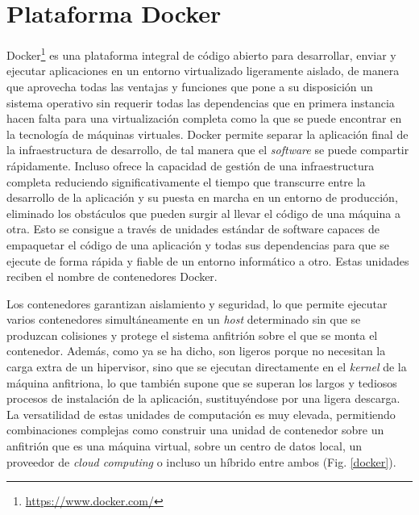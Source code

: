 \section{Plataforma Docker}

Docker\footnote{\url{https://www.docker.com/}} es una plataforma integral de código abierto para desarrollar, enviar y ejecutar aplicaciones en un entorno virtualizado ligeramente aislado, de manera que aprovecha todas las ventajas y funciones que pone a su disposición un sistema operativo sin requerir todas las dependencias que en primera instancia hacen falta para una virtualización completa como la que se puede encontrar en la tecnología de máquinas virtuales. Docker permite separar la aplicación final de la infraestructura de desarrollo, de tal manera que el \textit{software} se puede compartir rápidamente. Incluso ofrece la capacidad de gestión de una infraestructura completa reduciendo significativamente el tiempo que transcurre entre la desarrollo de la aplicación y su puesta en marcha en un entorno de producción, eliminado los obstáculos que pueden surgir al llevar el código de una máquina a otra. Esto se consigue a través de unidades estándar de software capaces de empaquetar el código de una aplicación y todas sus dependencias para que se ejecute de forma rápida y fiable de un entorno informático a otro. Estas unidades reciben el nombre de contenedores Docker.

Los contenedores garantizan aislamiento y seguridad, lo que permite ejecutar varios contenedores simultáneamente en un \textit{host} determinado sin que se produzcan colisiones y protege el sistema anfitrión sobre el que se monta el contenedor. Además, como ya se ha dicho, son ligeros porque no necesitan la carga extra de un hipervisor, sino que se ejecutan directamente en el \textit{kernel} de la máquina anfitriona, lo que también supone que se superan los largos y tediosos procesos de instalación de la aplicación, sustituyéndose por una ligera descarga. La versatilidad de estas unidades de computación es muy elevada, permitiendo combinaciones complejas como construir una unidad de contenedor sobre un anfitrión que es una máquina virtual, sobre un centro de datos local, un proveedor de \textit{cloud computing} o incluso un híbrido entre ambos (Fig. \ref{docker}).

